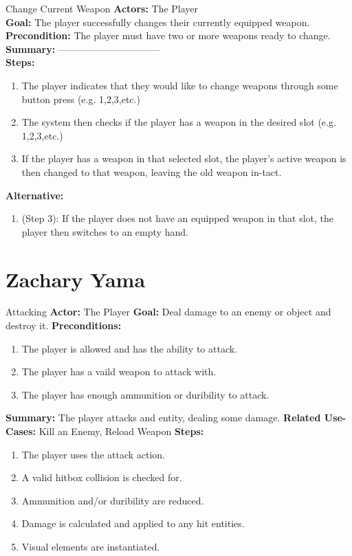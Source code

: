 \documentclass[12pt]{report}
\begin{document}
\begin{subsection}{Change Current Weapon}
\textbf{Actors:} The Player \\
\textbf{Goal:} The player successfully changes their currently equipped weapon. \\
\textbf{Precondition:} The player must have two or more weapons ready to change. \\
\textbf{Summary:} -------------------------------- \\
\textbf{Steps:}
\begin{enumerate}
	\item The player indicates that they would like to change weapons through some button press (e.g. 1,2,3,etc.)
	\item The system then checks if the player has a weapon in the desired slot (e.g. 1,2,3,etc.)
	\item If the player has a weapon in that selected slot, the player's active weapon is then changed to that weapon, leaving the old weapon in-tact.
\end{enumerate}
\textbf{Alternative:}
\begin{enumerate}
	\item (Step 3): If the player does not have an equipped weapon in that slot, the player then switches to an empty hand.
\end{enumerate}
\end{subsection}





\section{Zachary Yama}

\begin{subsection}{Attacking}
\textbf{Actor:} The Player
\textbf{Goal:} Deal damage to an enemy or object and destroy it.
\textbf{Preconditions:}
\begin{enumerate}
	\item The player is allowed and has the ability to attack.
	\item The player has a vaild weapon to attack with.
	\item The player has enough ammunition or duribility to attack.
\end{enumerate}
\textbf{Summary:} The player attacks and entity, dealing some damage.
\textbf{Related Use-Cases:} Kill an Enemy, Reload Weapon
\textbf{Steps:}
\begin{enumerate}
	\item The player uses the attack action.
	\item A valid hitbox collision is checked for.
	\item Ammunition and/or duribility are reduced.
	\item Damage is calculated and applied to any hit entities.
	\item Visual elements are instantiated.
\end{enumerate}
\end{subsection}
\end{document}
